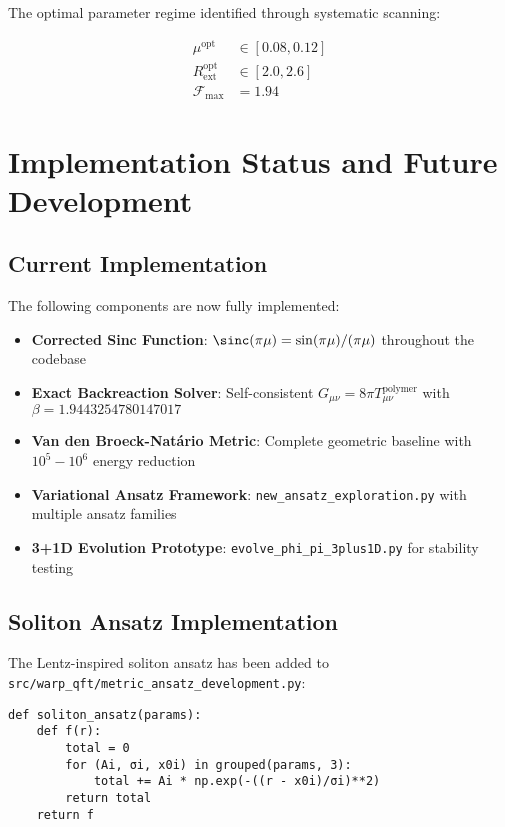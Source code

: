 \documentclass[12pt,a4paper]{article}
\begin{document}
The optimal parameter regime identified through systematic scanning:

\begin{align}
\mu^{\text{opt}} &\in [0.08, 0.12] \\
R_{\text{ext}}^{\text{opt}} &\in [2.0, 2.6] \\
\mathcal{F}_{\text{max}} &= 1.94
\end{align}

\section{Implementation Status and Future Development}

\subsection{Current Implementation}

The following components are now fully implemented:

\begin{itemize}
\item \textbf{Corrected Sinc Function}: $\sinc(\pi\mu) = \sin(\pi\mu)/(\pi\mu)$ throughout the codebase
\item \textbf{Exact Backreaction Solver}: Self-consistent $G_{\mu\nu} = 8\pi T_{\mu\nu}^{\text{polymer}}$ with $\beta = 1.9443254780147017$
\item \textbf{Van den Broeck-Natário Metric}: Complete geometric baseline with $10^5-10^6$ energy reduction
\item \textbf{Variational Ansatz Framework}: \texttt{new\_ansatz\_exploration.py} with multiple ansatz families
\item \textbf{3+1D Evolution Prototype}: \texttt{evolve\_phi\_pi\_3plus1D.py} for stability testing
\end{itemize}

\subsection{Soliton Ansatz Implementation}

The Lentz-inspired soliton ansatz has been added to \texttt{src/warp\_qft/metric\_ansatz\_development.py}:

\begin{verbatim}
def soliton_ansatz(params):
    def f(r):
        total = 0
        for (Ai, σi, x0i) in grouped(params, 3):
            total += Ai * np.exp(-((r - x0i)/σi)**2)
        return total
    return f
\end{verbatim}
\end{document}
